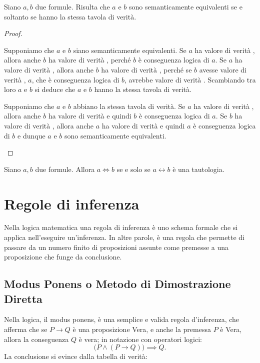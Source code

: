 \begin{proposition}\label{prop:stessa_tab_T-F}
    Siano \(a, b\) due formule. Risulta che \(a\) e \(b\) sono semanticamente equivalenti se e soltanto se hanno la stessa tavola di verità.
\end{proposition}

\begin{proof}
    \begin{lhs}
        Supponiamo che \(a\) e \(b\) siano semanticamente equivalenti. Se \(a\) ha valore di verità \true, allora anche \(b\) ha valore di verità \true, perché \(b\) è conseguenza logica di \(a\). Se \(a\) ha valore di verità \false, allora anche \(b\) ha valore di verità \false, perché se \(b\) avesse valore di verità \true, \(a\), che è conseguenza logica di \(b\), avrebbe valore di verità \true. Scambiando tra loro \(a\) e \(b\) si deduce che \(a\) e \(b\) hanno la stessa tavola di verità.
    \end{lhs}
    \begin{rhs}
        Supponiamo che \(a\) e \(b\) abbiano la stessa tavola di verità. Se \(a\) ha valore di verità \true, allora anche \(b\) ha valore di verità \true{} e quindi \(b\) è conseguenza logica di \(a\). Se \(b\) ha valore di verità \true{}, allora anche \(a\) ha valore di verità \true{} e quindi \(a\) è conseguenza logica di \(b\) e dunque \(a\) e \(b\) sono semanticamente equivalenti.
    \end{rhs}
\end{proof}

\begin{remark}
    Siano \(a, b\) due formule. Allora \(a \Longleftrightarrow b\) se e solo se \(a \longleftrightarrow b\) è una tautologia.\\
\end{remark}


\section{Regole di inferenza}\label{sec:regole_di_inferenza}
Nella logica matematica una regola di inferenza è uno schema formale che si applica nell'eseguire un'inferenza. In altre parole, è una regola che permette di passare da un numero finito di proposizioni assunte come premesse a una proposizione che funge da conclusione.

\subsection{Modus Ponens o Metodo di Dimostrazione Diretta}\label{subsec:modus_ponens}
Nella logica, il modus ponens, è una semplice e valida regola d'inferenza, che afferma che se \(P \longrightarrow  Q\) è una proposizione Vera, e anche la premessa \(P\) è Vera, allora la conseguenza \(Q\) è vera; in notazione con operatori logici:
\[
    \big(P \land (P \longrightarrow Q)\big) \implies Q.
\]
La conclusione si evince dalla tabella di verità:


